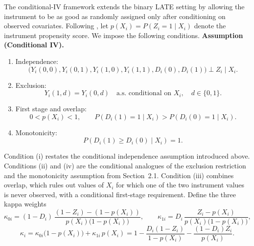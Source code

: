 \documentclass[12pt, a4paper, oneside]{article}
\theoremstyle{plain}
\theoremstyle{definition}
\begin{document}
The conditional-IV framework extends the binary LATE setting by allowing the instrument
to be as good as randomly assigned only after conditioning on observed covariates.
Following \citet{abadie2003semiparametric}, let
$p(X_i)=P(Z_i=1\mid X_i)$ denote the instrument propensity score. We impose the following conditions.
\textbf{Assumption (Conditional IV).}
\begin{enumerate}
    \item[(i)] Independence:
    \[
    \big(Y_i(0,0),Y_i(0,1),Y_i(1,0),Y_i(1,1),D_i(0),D_i(1)\big)
    \perp Z_i \mid X_i.
    \]
    \item[(ii)] Exclusion:
    \[
    Y_i(1,d)=Y_i(0,d) \quad \text{a.s. conditional on } X_i,\quad d\in\{0,1\}.
    \]
    \item[(iii)] First stage and overlap:
    \[
    0<p(X_i)<1,\qquad
    P(D_i(1)=1\mid X_i)>P(D_i(0)=1\mid X_i).
    \]
    \item[(iv)] Monotonicity:
    \[
    P(D_i(1)\geq D_i(0)\mid X_i)=1.
    \]
\end{enumerate}
Condition (i) restates the conditional independence assumption introduced above. Conditions (ii) and (iv) are the conditional analogues of the exclusion restriction and the monotonicity assumption from Section~2.1. Condition (iii) combines overlap, which rules out values of $X_i$ for which one of the two instrument values is never observed, with a conditional first-stage requirement.
Define the three kappa weights
\begin{equation}
    \kappa_{0i} = (1-D_i)\,\frac{(1-Z_i)-(1-p(X_i))}{p(X_i)\big(1-p(X_i)\big)}, \qquad
    \kappa_{1i} = D_i\,\frac{Z_i-p(X_i)}{p(X_i)\big(1-p(X_i)\big)},
\end{equation}
\begin{equation}
    \kappa_i = \kappa_{0i}\big(1-p(X_i)\big)+\kappa_{1i}\,p(X_i) = 1-\frac{D_i(1-Z_i)}{1-p(X_i)}-\frac{(1-D_i)Z_i}{p(X_i)}.
\end{equation}
\end{document}
